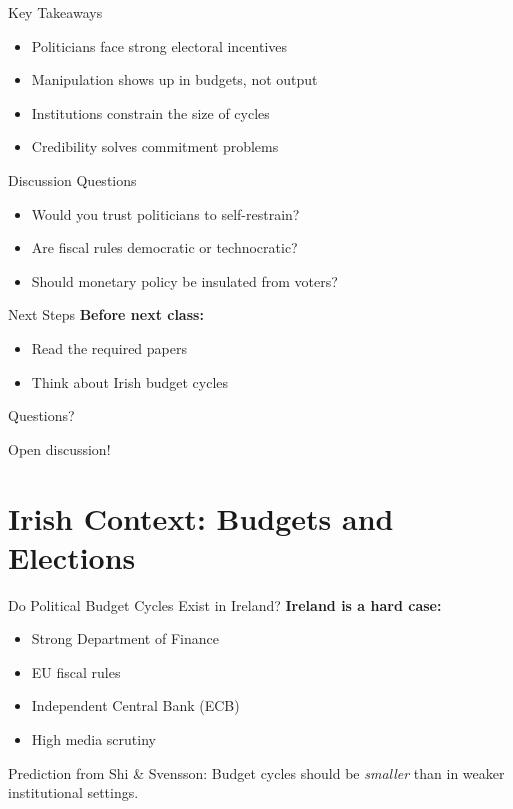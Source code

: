 \documentclass[10pt]{beamer}
\begin{document}
\begin{frame}{Key Takeaways}
\begin{itemize}
\item Politicians face strong electoral incentives
\item Manipulation shows up in budgets, not output
\item Institutions constrain the size of cycles
\item Credibility solves commitment problems
\end{itemize}
\end{frame}


\begin{frame}{Discussion Questions}
\begin{itemize}
\item Would you trust politicians to self-restrain?
\item Are fiscal rules democratic or technocratic?
\item Should monetary policy be insulated from voters?
\end{itemize}
\end{frame}


\begin{frame}{Next Steps}
\textbf{Before next class:}
\begin{itemize}
\item Read the required papers
\item Think about Irish budget cycles
\end{itemize}

\end{frame}


\begin{frame}{Questions?}
\begin{center}
\Large Open discussion!
\end{center}
\end{frame}



\section{Irish Context: Budgets and Elections}

\begin{frame}{Do Political Budget Cycles Exist in Ireland?}
\textbf{Ireland is a hard case:}

\begin{itemize}
\item Strong Department of Finance
\item EU fiscal rules
\item Independent Central Bank (ECB)
\item High media scrutiny
\end{itemize}

\vspace{0.4cm}
\alert{Prediction from Shi \& Svensson:}  
Budget cycles should be \emph{smaller} than in weaker institutional settings.
\end{frame}
\end{document}
